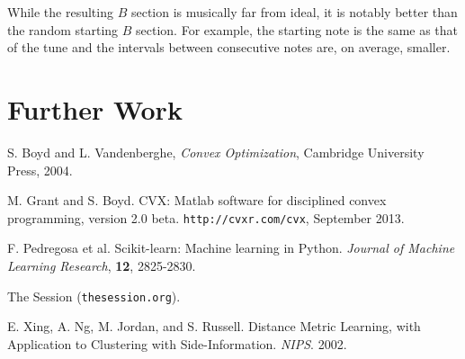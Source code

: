 \documentclass{article} %
\begin{document}
While the resulting $B$ section is musically far from ideal, it is notably
better than the random starting $B$ section. For example, the starting note is
the same as that of the tune and the intervals between consecutive notes are, on
average, smaller.

\section{Further Work}



\begin{thebibliography}{9}

S. Boyd and L. Vandenberghe, \textit{Convex Optimization}, Cambridge University
Press, 2004.

M. Grant and S. Boyd. CVX: Matlab software for disciplined convex
programming, version 2.0 beta. \texttt{http://cvxr.com/cvx}, September 2013.

F. Pedregosa et al. Scikit-learn: Machine learning in Python. 
\textit{Journal of Machine Learning Research}, \textbf{12}, 2825-2830.

The Session (\texttt{thesession.org}).

E. Xing, A. Ng, M. Jordan, and S. Russell. Distance Metric Learning, with
Application to Clustering with Side-Information. \textit{NIPS}. 2002.

\end{thebibliography}
\end{document}
